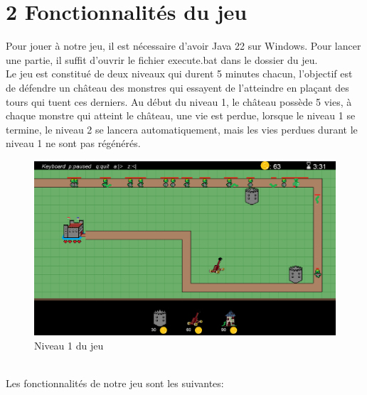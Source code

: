 \documentclass{report}
\begin{document}
\section*{2 Fonctionnalités du jeu}
Pour jouer à notre jeu, il est nécessaire d'avoir Java 22 sur Windows. Pour lancer une partie, il suffit d'ouvrir le fichier execute.bat dans le dossier du jeu.\\
Le jeu est constitué de deux niveaux qui durent 5 minutes chacun, l'objectif est de défendre un château des monstres qui essayent de l'atteindre en plaçant des tours qui tuent ces derniers. Au début du niveau 1, le château possède 5 vies, à chaque monstre qui atteint le château, une vie est perdue, lorsque le niveau 1 se termine, le niveau 2 se lancera automatiquement, mais les vies perdues durant le niveau 1 ne sont pas régénérés.
\begin{figure}[!ht]
	\centering
	\includegraphics[scale=.5]{Jeu}
	\caption{Niveau 1 du jeu}
	\end{figure}
\\
Les fonctionnalités de notre jeu sont les suivantes:
\end{document}
